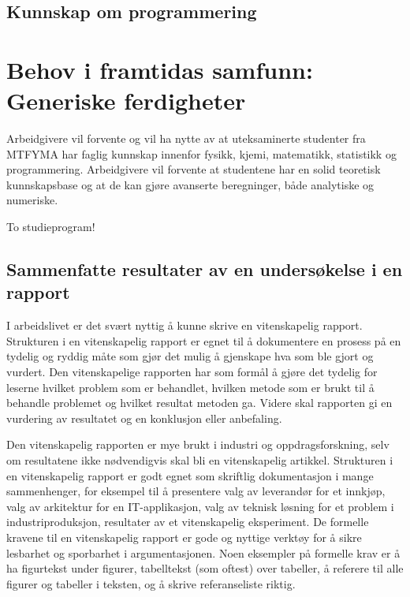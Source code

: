 \documentclass{article}
\begin{document}
\subsection{Kunnskap om programmering}

\section{Behov i framtidas samfunn: Generiske ferdigheter}
\label{Behov}
Arbeidgivere vil forvente og vil ha nytte av at uteksaminerte studenter fra MTFYMA har faglig kunnskap innenfor fysikk, kjemi, matematikk, statistikk og programmering.
Arbeidgivere vil forvente at studentene har en solid teoretisk kunnskapsbase og at de kan gjøre avanserte beregninger, både analytiske og numeriske.

To studieprogram!

\subsection{Sammenfatte resultater av en undersøkelse i en rapport}
I arbeidslivet er det svært nyttig å kunne skrive en vitenskapelig rapport.
Strukturen i en vitenskapelig rapport er egnet til å dokumentere en prosess på en tydelig og ryddig måte som gjør det mulig å gjenskape hva som ble gjort og vurdert.
Den vitenskapelige rapporten har som formål å gjøre det tydelig for leserne hvilket problem som er behandlet, hvilken metode som er brukt til å behandle problemet og hvilket resultat metoden ga.
Videre skal rapporten gi en vurdering av resultatet og en konklusjon eller anbefaling.

Den vitenskapelig rapporten er mye brukt i industri og oppdragsforskning, selv om resultatene ikke nødvendigvis skal bli en vitenskapelig artikkel.
Strukturen i en vitenskapelig rapport er godt egnet som skriftlig dokumentasjon i mange sammenhenger, for eksempel til å presentere valg av leverandør for et innkjøp, valg av arkitektur for en IT-applikasjon, valg av teknisk løsning for et problem i industriproduksjon, resultater av et vitenskapelig eksperiment.
De formelle kravene til en vitenskapelig rapport er gode og nyttige verktøy for å sikre lesbarhet og sporbarhet i argumentasjonen.
Noen eksempler på formelle krav er å ha figurtekst under figurer, tabelltekst {\color{red}(som oftest)} over tabeller, å referere til alle figurer og tabeller i teksten, og å skrive referanseliste riktig.
\end{document}

